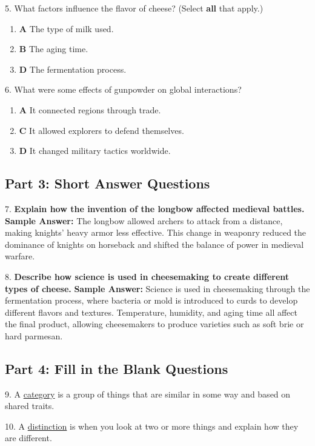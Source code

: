 \documentclass[12pt]{article}
\begin{document}
5. What factors influence the flavor of cheese? (Select \textbf{all} that apply.)
\begin{enumerate}[label=\Alph*.]
    \item \textbf{A} The type of milk used.
    \item \textbf{B} The aging time.
    \item \textbf{D} The fermentation process.
\end{enumerate}

6. What were some effects of gunpowder on global interactions?
\begin{enumerate}[label=\Alph*.]
    \item \textbf{A} It connected regions through trade.
    \item \textbf{C} It allowed explorers to defend themselves.
    \item \textbf{D} It changed military tactics worldwide.
\end{enumerate}

\subsection*{Part 3: Short Answer Questions}

7. \textbf{Explain how the invention of the longbow affected medieval battles.}
\textbf{Sample Answer:} The longbow allowed archers to attack from a distance, making knights’ heavy armor less effective. This change in weaponry reduced the dominance of knights on horseback and shifted the balance of power in medieval warfare.

8. \textbf{Describe how science is used in cheesemaking to create different types of cheese.}
\textbf{Sample Answer:} Science is used in cheesemaking through the fermentation process, where bacteria or mold is introduced to curds to develop different flavors and textures. Temperature, humidity, and aging time all affect the final product, allowing cheesemakers to produce varieties such as soft brie or hard parmesan.

\subsection*{Part 4: Fill in the Blank Questions}

9. A \underline{category} is a group of things that are similar in some way and based on shared traits.

10. A \underline{distinction} is when you look at two or more things and explain how they are different.
\end{document}
